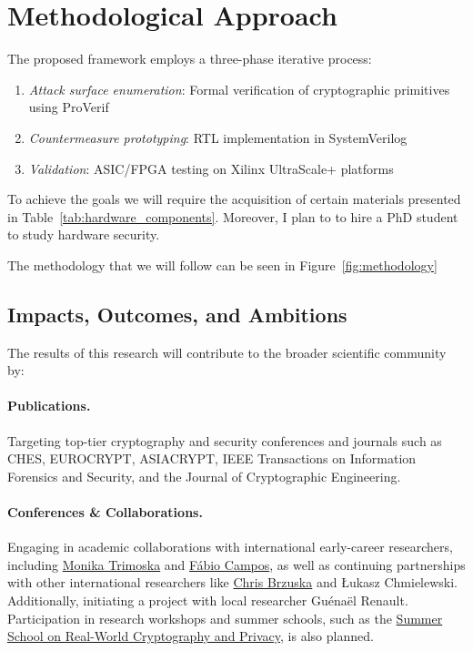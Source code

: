 \documentclass[11pt, a4paper]{article}
\begin{document}
\section*{Methodological Approach}
The proposed framework employs a three-phase iterative process:
\begin{enumerate}
    \item \textit{Attack surface enumeration}: Formal verification of cryptographic primitives using ProVerif
    \item \textit{Countermeasure prototyping}: RTL implementation in SystemVerilog
    \item \textit{Validation}: ASIC/FPGA testing on Xilinx UltraScale+ platforms
\end{enumerate}


To achieve the goals we will require the acquisition of certain materials presented in 
Table~\ref{tab:hardware_components}. Moreover, I plan to to hire a PhD student to study 
hardware security. 

The methodology that we will follow can be seen in Figure~\ref{fig:methodology}

\subsection*{Impacts, Outcomes, and Ambitions}

The results of this research will contribute to the broader scientific community by:

\paragraph{Publications.} Targeting top-tier cryptography and security conferences and journals such as 
CHES, EUROCRYPT, ASIACRYPT, IEEE Transactions on Information Forensics and Security, and the 
Journal of Cryptographic Engineering.

\paragraph{Conferences \& Collaborations.} Engaging in academic collaborations with international 
early-career researchers, including \href{https://mtrimoska.com/}{Monika Trimoska} and 
\href{https://www.sopmac.de/index.html}{Fábio Campos}, as well as continuing partnerships 
with other international researchers like \href{https://research.aalto.fi/en/persons/chris-brzuska}{Chris Brzuska} 
and Łukasz Chmielewski. Additionally, initiating a project with local researcher Guénaël Renault. 
Participation in research workshops and summer schools, such as the 
\href{https://summerschool-croatia.cs.ru.nl/}{Summer School on Real-World Cryptography and Privacy}, 
is also planned.
\end{document}
